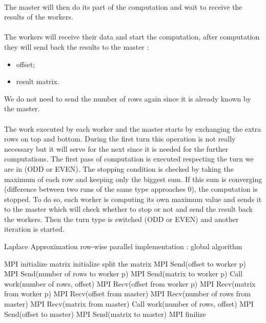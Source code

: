 \documentclass[]{article}
\begin{document}
\paragraph{} The master will then do its part of the computation and wait to receive the results of the workers. 

\paragraph{} The workers will receive their data and start the computation, after computation they will send back the results to the master : 
\begin{itemize}
	\item offset;
	\item result matrix.
\end{itemize}
We do not need to send the number of rows again since it is already known by the master. 

\paragraph{} The work executed by each worker and the master starts by exchanging the extra rows on top and bottom. During the first turn this operation is not really necessary but it will serve for the next since it is needed for the further computations. The first pass of computation is executed respecting the turn we are in (ODD or EVEN). The stopping condition is checked by taking the maximum of each row and keeping only the biggest sum. If this sum is converging (difference between two runs of the same type approaches $0$), the computation is stopped. To do so, each worker is computing its own maximum value and sends it to the master which will check whether to stop or not and send the result back the workers. Then the turn type is switched (ODD or EVEN) and another iteration is started.

\begin{algorithm}
	\caption{Laplace Approximation row-wise parallel implementation : global algorithm}
	\label{laplace}
	\begin{algorithmic}
		\STATE MPI initialize
		\STATE matrix initialize
		\STATE split the matrix
				\STATE MPI Send(offset to worker p)
				\STATE MPI Send(number of rows to worker p)
				\STATE MPI Send(matrix to worker p)
			\ENDFOR
		\STATE Call work(number of rows, offset)
				\STATE MPI Recv(offset from worker p)
				\STATE MPI Recv(matrix from worker p)
			\ENDFOR
		\ELSE 
			\STATE MPI Recv(offset from master)
			\STATE MPI Recv(number of rows from master)
			\STATE MPI Recv(matrix from master)
			\STATE Call work(number of rows, offset)
			\STATE MPI Send(offset to master)
			\STATE MPI Send(matrix to master)
		\ENDIF
		\STATE MPI finilize
	\end{algorithmic}
\end{algorithm}
\end{document}
